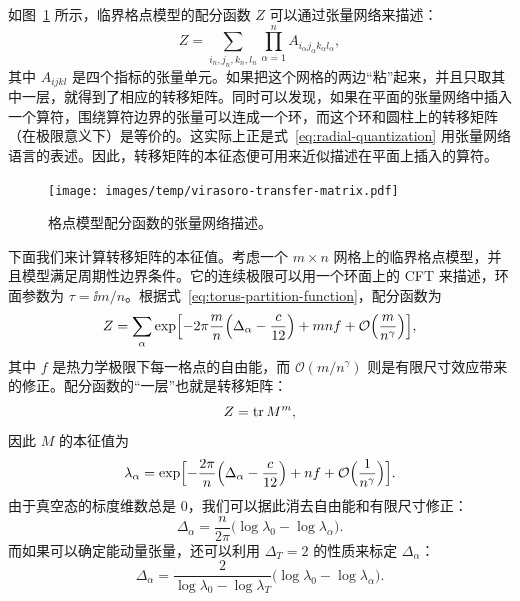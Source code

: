 
如图~\ref{fig:partition-function-tensor-network} 所示，临界格点模型的配分函数 $Z$ 可以通过张量网络来描述：
\begin{equation}
  Z = \sum_{i_n,j_n,k_n,l_n} \prod_{\alpha=1}^n A_{i_\alpha j_\alpha k_\alpha l_\alpha},
  \label{eq:partition-function-tensor-network}
\end{equation}
其中 $A_{ijkl}$ 是四个指标的张量单元。如果把这个网格的两边“粘”起来，并且只取其中一层，就得到了相应的转移矩阵。同时可以发现，如果在平面的张量网络中插入一个算符，围绕算符边界的张量可以连成一个环，而这个环和圆柱上的转移矩阵（在极限意义下）是等价的。这实际上正是式~\eqref{eq:radial-quantization} 用张量网络语言的表述。因此，转移矩阵的本征态便可用来近似描述在平面上插入的算符。

\begin{figure}[ht]
  \centering
  \texttt{[image: images/temp/virasoro-transfer-matrix.pdf]}
  \caption[格点模型配分函数的张量网络描述]{格点模型配分函数的张量网络描述。}
  \label{fig:partition-function-tensor-network}
\end{figure}

下面我们来计算转移矩阵的本征值。考虑一个 $m\times n$ 网格上的临界格点模型，并且模型满足周期性边界条件。它的连续极限可以用一个环面上的 CFT 来描述，环面参数为 $\tau=\ii m/n$。根据式~\eqref{eq:torus-partition-function}，配分函数为\cite{hauru2016topological}
\begin{equation}
  Z = \sum_\alpha \exp \Bigl[
        - 2\pi \frac mn \Bigl(\Delta_\alpha - \frac{c}{12} \Bigr)
        + mnf + \mathcal{O} \Bigl( \frac{m}{n^\gamma} \Bigr)
      \Bigr],
\end{equation}
其中 $f$ 是热力学极限下每一格点的自由能，而 $\mathcal{O}(m/n^\gamma)$ 则是有限尺寸效应带来的修正。配分函数的“一层”也就是转移矩阵：
\begin{equation}
  Z = \operatorname{tr} M^m,
\end{equation}
因此 $M$ 的本征值为
\begin{equation}
  \lambda_\alpha = \exp \Bigl[
        - \frac{2\pi}{n} \Bigl(\Delta_\alpha - \frac{c}{12} \Bigr)
        + nf + \mathcal{O} \Bigl( \frac{1}{n^\gamma} \Bigr)
      \Bigr].
\end{equation}
由于真空态的标度维数总是 0，我们可以据此消去自由能和有限尺寸修正：
\begin{equation}
  \Delta_\alpha = \frac{n}{2\pi} \bigl( \log\lambda_0 - \log \lambda_\alpha \bigr).
\end{equation}
而如果可以确定能动量张量，还可以利用 $\Delta_T=2$ 的性质来标定 $\Delta_\alpha$：
\begin{equation}
  \Delta_\alpha = \frac{2}{\log\lambda_0 - \log\lambda_T} \bigl( \log\lambda_0 - \log \lambda_\alpha \bigr).
  \label{eq:scaling-dimension-rescale}
\end{equation}

